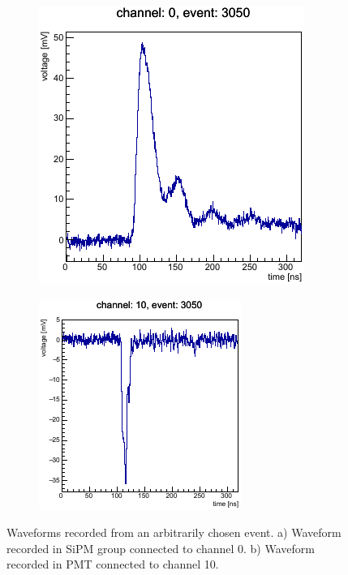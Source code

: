     \begin{figure}[h]
    	\centering
    	\begin{subfigure}{.5\textwidth}
    		\centering
    		\includegraphics[width=.7\textwidth]{pictures/waveform-sipm.pdf}
    		\caption{}
    		\label{fig:waveform-sipm}
    	\end{subfigure}%
    \begin{subfigure}{.5\textwidth}
    	\centering
    	\includegraphics[width=.7\textwidth]{pictures/waveform-pmt.pdf}
    	\caption{}
    	\label{fig:waveform-pmt}
    \end{subfigure}
	\caption{Waveforms recorded from an arbitrarily chosen event. a) Waveform recorded in \ac{SiPM} group connected to channel 0. b) Waveform recorded in \ac{PMT} connected to channel 10.}
	\label{fig:waveform-real}
    \end{figure}

